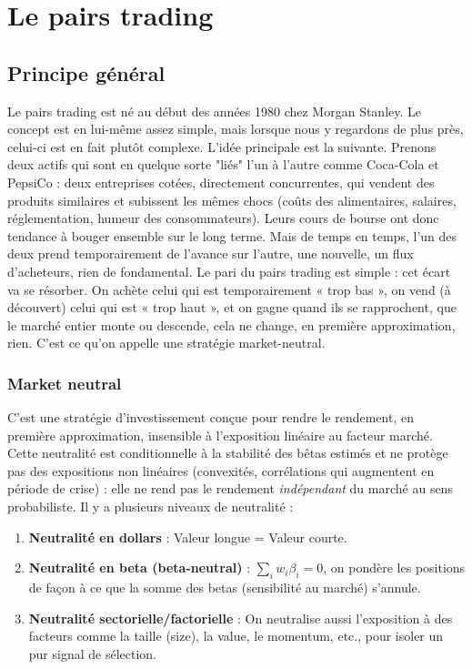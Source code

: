 \documentclass{article}
\begin{document}
\section{Le pairs trading}
\subsection{Principe général}
Le pairs trading est né au début des années 1980 chez Morgan Stanley. Le concept est en lui-même assez simple, mais lorsque nous y regardons de plus près, celui-ci est en fait plutôt complexe. L'idée principale est la suivante. Prenons deux actifs qui sont en quelque sorte "liés" l'un à l'autre comme Coca-Cola et PepsiCo : deux entreprises cotées, directement concurrentes, qui vendent des produits similaires et subissent les mêmes chocs (coûts des alimentaires, salaires, réglementation, humeur des consommateurs). Leurs cours de bourse ont donc tendance à bouger ensemble sur le long terme. Mais de temps en temps, l'un des deux prend temporairement de l'avance sur l'autre, une nouvelle, un flux d'acheteurs, rien de fondamental. Le pari du pairs trading est simple : cet écart va se résorber. On achète celui qui est temporairement « trop bas », on vend (à découvert) celui qui est « trop haut », et on gagne quand ils se rapprochent, que le marché entier monte ou descende, cela ne change, en première approximation, rien. C'est ce qu'on appelle une stratégie market-neutral.\\
\subsubsection{Market neutral}
C'est une stratégie d'investissement conçue pour rendre le rendement, en première approximation, insensible à l'exposition linéaire au facteur marché. Cette neutralité est conditionnelle à la stabilité des bêtas estimés et ne protège pas des expositions non linéaires (convexités, corrélations qui augmentent en période de crise) : elle ne rend pas le rendement \emph{indépendant} du marché au sens probabiliste. Il y a plusieurs niveaux de neutralité :
\begin{enumerate}
    \item \textbf{Neutralité en dollars} : Valeur longue = Valeur courte.
    \item \textbf{Neutralité en beta (beta-neutral)} : $\sum_i w_i \beta_i = 0$, on pondère les positions de façon à ce que la somme des betas (sensibilité au marché) s'annule.
    \item \textbf{Neutralité sectorielle/factorielle} : On neutralise aussi l'exposition à des facteurs comme la taille (size), la value, le momentum, etc., pour isoler un pur signal de sélection.
\end{enumerate}
\end{document}
